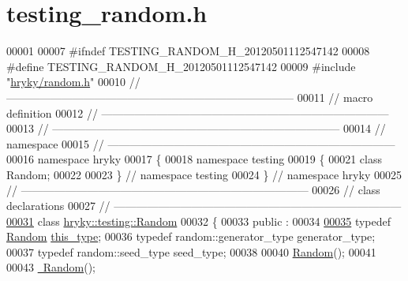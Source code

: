 \hypertarget{testing__random_8h_source}{\section{testing\-\_\-random.\-h}
}

\begin{DoxyCode}
00001 
00007 \textcolor{preprocessor}{#ifndef TESTING\_RANDOM\_H\_20120501112547142}
00008 \textcolor{preprocessor}{}\textcolor{preprocessor}{#define TESTING\_RANDOM\_H\_20120501112547142}
00009 \textcolor{preprocessor}{}\textcolor{preprocessor}{#include "\hyperlink{random_8h}{hryky/random.h}"}
00010 \textcolor{comment}{//
      ------------------------------------------------------------------------------}
00011 \textcolor{comment}{// macro definition}
00012 \textcolor{comment}{//
      ------------------------------------------------------------------------------}
00013 \textcolor{comment}{//
      ------------------------------------------------------------------------------}
00014 \textcolor{comment}{// namespace}
00015 \textcolor{comment}{//
      ------------------------------------------------------------------------------}
00016 \textcolor{keyword}{namespace }hryky
00017 \{
00018 \textcolor{keyword}{namespace }testing
00019 \{
00021     \textcolor{keyword}{class }Random;
00022 
00023 \} \textcolor{comment}{// namespace testing}
00024 \} \textcolor{comment}{// namespace hryky}
00025 \textcolor{comment}{//
      ------------------------------------------------------------------------------}
00026 \textcolor{comment}{// class declarations}
00027 \textcolor{comment}{//
      ------------------------------------------------------------------------------}
\hypertarget{testing__random_8h_source_l00031}{}\hyperlink{classhryky_1_1testing_1_1_random}{00031} \textcolor{comment}{}\textcolor{keyword}{class }\hyperlink{classhryky_1_1testing_1_1_random}{hryky::testing::Random}
00032 \{
00033 \textcolor{keyword}{public} :
00034 
\hypertarget{testing__random_8h_source_l00035}{}\hyperlink{classhryky_1_1testing_1_1_random_a9ba232c45fe9f72a7de3f8074841a600}{00035}     \textcolor{keyword}{typedef} \hyperlink{classhryky_1_1testing_1_1_random}{Random}                  \hyperlink{classhryky_1_1testing_1_1_random_a9ba232c45fe9f72a7de3f8074841a600}{this_type};
00036     \textcolor{keyword}{typedef} random::generator\_type  generator\_type;
00037     \textcolor{keyword}{typedef} random::seed\_type       seed\_type;
00038 
00040     \hyperlink{classhryky_1_1testing_1_1_random_aca50cb32f01d8a1adadd5b7aa958ed46}{Random}();
00041 
00043     \hyperlink{classhryky_1_1testing_1_1_random_a2fca1ef5553e2c2151de6668c54ded5d}{~Random}();

\end{DoxyCode}
